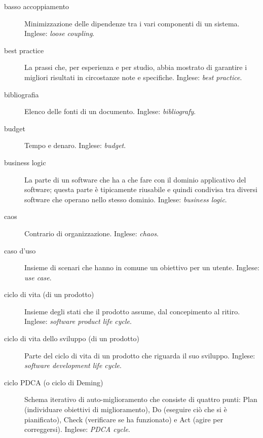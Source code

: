 \documentclass[a4paper]{article}
\begin{document}
\begin{description}
	\item[basso accoppiamento] 

			Minimizzazione delle dipendenze tra i vari componenti di un sistema. Inglese: \emph{loose coupling}.
			
	\item[best practice] 

			La prassi che, per esperienza e per studio, abbia mostrato di garantire i migliori risultati in circostanze note e specifiche. Inglese: \emph{best practice}.
			
	\item[bibliografia] 

			Elenco delle fonti di un documento. Inglese: \emph{bibliografy}.
			
	\item[budget] 

			Tempo e denaro. Inglese: \emph{budget}.
			
	\item[business logic] 

			La parte di un software che ha a che fare con il dominio applicativo del software; questa parte è tipicamente riusabile e quindi condivisa tra diversi software che operano nello stesso dominio. Inglese: \emph{business logic}.
			
	\item[caos] 

			Contrario di organizzazione. Inglese: \emph{chaos}.
			
	\item[caso d'uso] 

			Insieme di scenari che hanno in comune un obiettivo per un utente. Inglese: \emph{use case}.
			
	\item[ciclo di vita (di un prodotto)] 

			Insieme degli stati che il prodotto assume, dal concepimento al ritiro. Inglese: \emph{software product life cycle}.
			
	\item[ciclo di vita dello sviluppo (di un prodotto)] 

			Parte del ciclo di vita di un prodotto che riguarda il suo sviluppo. Inglese: \emph{software development life cycle}.
			
	\item[ciclo PDCA (o ciclo di Deming)] 

			Schema iterativo di auto-miglioramento che consiste di quattro punti: Plan (individuare obiettivi di miglioramento), Do (eseguire ciò che si è pianificato), Check (verificare se ha funzionato) e Act (agire per correggersi). Inglese: \emph{PDCA cycle}.
			

\end{description}
\end{document}
